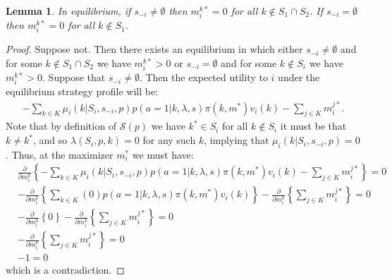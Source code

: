 \documentclass[12pt]{article}
\newtheorem{lemma}[theorem]{Lemma}
\newcommand{\pderiv}[2]{\frac{\partial #1}{\partial #2}}
\begin{document}
\begin{lemma}In equilibrium, if $s_{-i}\neq\emptyset$ then $m_i^{k*}=0$ for all $k\notin S_1\cap S_2$.  If $s_{-i}=\emptyset$ then $m_i^{k*}=0$ for all $k\notin S_1$.
\end{lemma}
\begin{proof}Suppose not.  Then there exists an equilibrium in which either $s_{-i}\neq\emptyset$ and for some $k\notin S_1\cap S_2$ we have $m_i^{k*}>0$ or $s_{-i}=\emptyset$ and for some $k\notin S_i$ we have $m_i^{k*}>0$.  Suppose that $s_{-i}\neq\emptyset$.  Then the expected utility to $i$ under the equilibrium strategy profile will be:
\begin{align*}
-\sum_{k\in K}\mu_i(k|S_i,s_{-i},p)p(a=1|k,\lambda,s)\pi(k,m^*)v_i(k)-\sum_{j\in K}m_i^{j*}.
\end{align*}Note that by definition of $\mathcal{S}(p)$ we have $k^*\in S_i$ for all $k\notin S_i$ it must be that $k\neq k^*$, and so $\lambda(S_i,p,k)=0$ for any such $k$, implying that $\mu_i(k|S_i,s_{-i},p)=0$.  Thus, at the maximizer $m_i^*$ we must have:
\begin{align*}
&\pderiv{}{m_i^k}\left\{-\sum_{k\in K}\mu_i(k|S_i,s_{-i},p)p(a=1|k,\lambda,s)\pi(k,m^*)v_i(k)-\sum_{j\in K}m_i^{j*}\right\}=0\\
&-\pderiv{}{m_i^k}\left\{\sum_{k\in K}(0)p(a=1|k,\lambda,s)\pi(k,m^*)v_i(k)\right\}-\pderiv{}{m_i^k}\left\{\sum_{j\in K}m_i^{j*}\right\}=0\\
&-\pderiv{}{m_i^k}\left\{0\right\}-\pderiv{}{m_i^k}\left\{\sum_{j\in K}m_i^{j*}\right\}=0\\
&-\pderiv{}{m_i^k}\left\{\sum_{j\in K}m_i^{j*}\right\}=0\\
&-1=0
\end{align*}which is a contradiction.
\end{proof}
\end{document}
